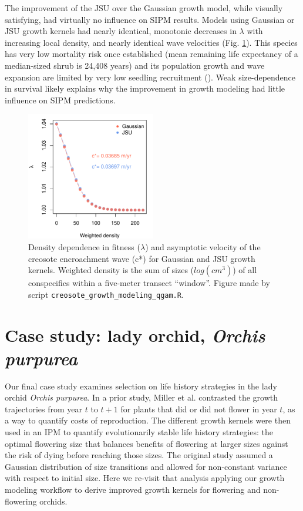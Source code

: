 \documentclass[12pt]{article}
\begin{document}
The improvement of the JSU over the Gaussian growth model, while visually satisfying, had virtually no influence on SIPM results. 
Models using Gaussian or JSU growth kernels had nearly identical, monotonic decreases in $\lambda$ with increasing local density, and nearly identical wave velocities (Fig. \ref{fig:creosote_lambda_cstar}). 
This species has very low mortality risk once established (mean remaining life expectancy of a median-sized shrub is 24,408 years) and its population growth and wave expansion are limited by very low seedling recruitment (\citep{drees2023demography}). 
Weak size-dependence in survival likely explains why the improvement in growth modeling had little influence on SIPM predictions. 

\begin{figure}[tbp]
	\centering
	\includegraphics[width=0.5\textwidth]{figures/creosote_DD_lambda.pdf}
	\caption{Density dependence in fitness ($\lambda$) and asymptotic velocity of the creosote encroachment wave (c*) for Gaussian and JSU growth kernels. Weighted density is the sum of sizes ($log(cm^3)$) of all conspecifics within a five-meter transect ``window''. Figure made by script \texttt{creosote\_growth\_modeling\_qgam.R}.}
	\label{fig:creosote_lambda_cstar}
\end{figure}

\clearpage 

\section{Case study: lady orchid, \emph{Orchis purpurea}}
Our final case study examines selection on life history strategies in the lady orchid \textit{Orchis purpurea}. 
In a prior study, Miller et al. \citeyear{miller2012evolutionary} contrasted the growth trajectories from year $t$ to $t+1$ for plants that did or did not flower in year $t$, as a way to quantify costs of reproduction. 
The different growth kernels were then used in an IPM to quantify evolutionarily stable life history strategies: the optimal flowering size that balances benefits of flowering at larger sizes against the risk of dying before reaching those sizes. 
The original study assumed a Gaussian distribution of size transitions and allowed for non-constant variance with respect to initial size. 
Here we re-visit that analysis applying our growth modeling workflow to derive improved growth kernels for flowering and non-flowering orchids. 
\end{document}
